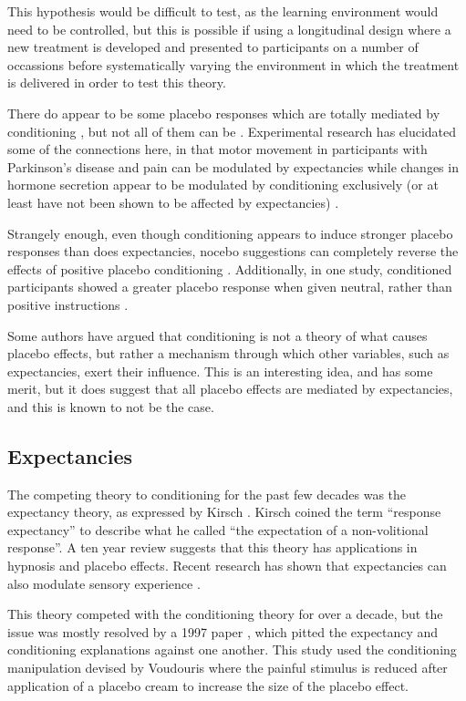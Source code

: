 This hypothesis would be difficult to test, as the learning environment would need to be controlled, but this is possible if using a longitudinal design where a new treatment is developed and presented to participants on a number of occassions before systematically varying the environment in which the treatment is delivered in order to test this theory. 

There do appear to be some placebo responses which are totally mediated by conditioning \cite{Amanzio1999}, but not all of them can be \cite{Benedetti2003a}. Experimental research has elucidated some of the connections here, in that motor movement in participants with Parkinson's disease and pain can be modulated by expectancies while changes in hormone secretion appear to be modulated by conditioning exclusively (or at least have not been shown to be affected by expectancies) \cite{Benedetti2003a}.

Strangely enough, even though conditioning appears to induce stronger placebo responses than does expectancies, nocebo suggestions can completely reverse the effects of positive placebo conditioning \cite{Benedetti2008}. Additionally, in one study, conditioned participants showed a greater placebo response when given neutral, rather than positive instructions \cite{Klinger2007a}. 

Some authors have argued \cite{Stewart-Williams2004b} that conditioning is not a theory of what causes placebo effects, but rather a mechanism through which other variables, such as expectancies, exert their influence. This is an interesting idea, and has some merit, but it does suggest that all placebo effects are mediated by expectancies, and this is known to not be the case. 

\subsection{Expectancies}
\label{sec:expectancies}

The competing theory to conditioning for the past few decades was the expectancy theory, as expressed by Kirsch \cite{Kirsch1985}. Kirsch coined the term ``response expectancy'' to describe what he called ``the expectation of a non-volitional response''. A ten year review \cite{Kirsch1997}  suggests that this theory has applications in hypnosis and placebo effects. Recent research has shown that expectancies can also modulate sensory experience \cite{Benedetti2008}. 

This theory competed with the conditioning theory for over a decade, but the issue was mostly resolved by a 1997 paper \cite{Montgomery1997}, which pitted the expectancy and conditioning explanations against one another. This study used the conditioning manipulation devised by Voudouris \cite{Voudouris1985} where the painful stimulus is reduced after application of a placebo cream to increase the size of the placebo effect. 

